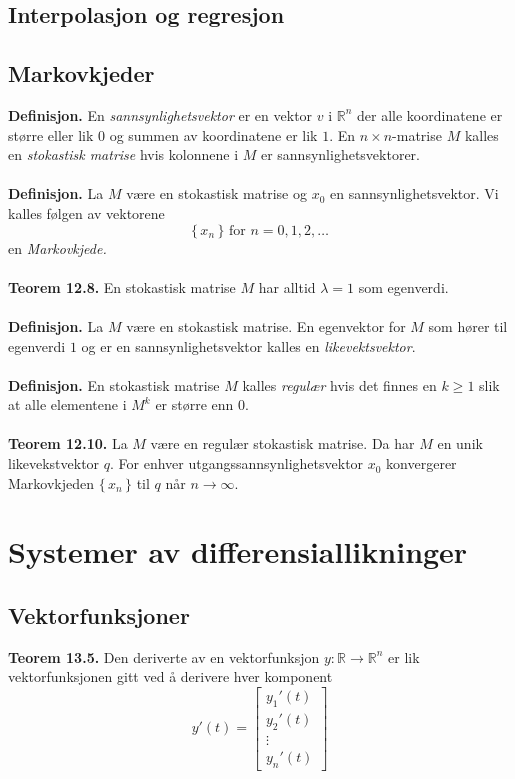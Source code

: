 \documentclass{article}
\begin{document}
\subsection{Interpolasjon og regresjon}


\subsection{Markovkjeder}
\textbf{Definisjon.} En \textit{sannsynlighetsvektor} er en vektor $v$ i $\mathbb{R}^n$ der alle koordinatene er større eller lik $0$ og summen av koordinatene er lik $1$. En $n \times n$-matrise $M$ kalles en \textit{stokastisk matrise} hvis kolonnene i $M$ er sannsynlighetsvektorer.
\\\\
\textbf{Definisjon.} La $M$ være en stokastisk matrise og $x_0$ en sannsynlighetsvektor. Vi kalles følgen av vektorene
\[ \{\, x_n \,\} \text{ for } n = 0, 1, 2, \dots \]
en \textit{Markovkjede.}
\\\\
\textbf{Teorem 12.8.} En stokastisk matrise $M$ har alltid $\lambda = 1$ som egenverdi.
\\\\
\textbf{Definisjon.} La $M$ være en stokastisk matrise. En egenvektor for $M$ som hører til egenverdi $1$ og er en sannsynlighetsvektor kalles en \textit{likevektsvektor}.
\\\\
\textbf{Definisjon.} En stokastisk matrise $M$ kalles \textit{regulær} hvis det finnes en $k \geq 1$ slik at alle elementene i $M^k$ er større enn 0.
\\\\
\textbf{Teorem 12.10.} La $M$ være en regulær stokastisk matrise. Da har $M$ en unik likevekstvektor $q$. For enhver utgangssannsynlighetsvektor $x_0$ konvergerer Markovkjeden $\{\, x_n \,\}$ til $q$ når $n \rightarrow \infty$.




\clearpage
\section{Systemer av differensiallikninger}


\subsection{Vektorfunksjoner}
\textbf{Teorem 13.5.} Den deriverte av en vektorfunksjon $y: \mathbb{R} \rightarrow \mathbb{R}^n$ er lik vektorfunksjonen gitt ved å derivere hver komponent
\[ y'(t) = \begin{bmatrix}
    y_1'(t) \\ y_2'(t) \\ \vdots \\ y_n'(t)
\end{bmatrix} \]
\end{document}
